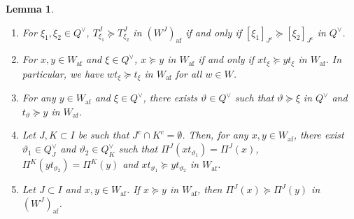 \documentclass[10pt]{amsart}
\newtheorem{lemm}[theo]{Lemma}
\theoremstyle{definition}\newtheorem{defi}[theo]{Definition}
\theoremstyle{remark}\newtheorem{rema}[theo]{Remark}
\DeclareMathOperator{\af}{af}
\begin{document}
\begin{lemm} \label{lem:easy}\ \\[-1.2em]
\begin{enumerate}[label=(\arabic*)]
\item\label{Lemm3.9_1}
For $\xi_1 , \xi_2 \in Q^{\vee}$, 
$T^J_{\xi_1} \succeq T^J_{\xi_2}$ 
in 
$(W^J)_{\af}$
if and only if 
$[\xi_1]_{J^c} \succeq [\xi_2]_{J^c}$ 
in 
$Q^{\vee}$.
\item\label{Lemm3.9_2}
For 
$x , y \in W_{\af}$
and 
$\xi \in Q^{\vee}$, 
$x \succeq y$ 
in 
$W_{\af}$
if and only if
$x t_{\xi} \succeq yt_{\xi}$
in 
$W_{\af}$. 
In particular, we have 
$wt_{\xi} \succeq t_{\xi}$ 
in 
$W_{\af}$ 
for all 
$w \in W$.
\item\label{Lemm3.9_3}
For any 
$y \in W_{\af}$
and 
$\xi \in Q^{\vee}$, 
there exists 
$\vartheta \in Q^{\vee}$
such that 
$\vartheta \succeq \xi$ 
in 
$Q^{\vee}$
and 
$t_{\vartheta} \succeq y$
in 
$W_{\af}$.
\item\label{Lemm3.9_4}
Let 
$J,K \subset I$ 
be such that 
$J^c \cap K^c = \emptyset$. 
Then, 
for any 
$x , y \in W_{\af}$, 
there exist
$\vartheta_1 \in Q_J^{\vee}$ 
and 
$\vartheta_2 \in Q_K^{\vee}$
such that 
$\Pi^J(x t_{\vartheta_1}) = \Pi^{J}(x)$, 
$\Pi^K(y t_{\vartheta_2}) = \Pi^K(y)$ and 
$x t_{\vartheta_1} \succeq y t_{\vartheta_2}$
in
$W_{\af}$.
\item\label{Lemm3.9_5}
Let $J \subset I$ and $x , y \in W_{\af}$. 
If 
$x \succeq y$ in $W_{\af}$, 
then 
$\Pi^J(x) \succeq \Pi^J(y)$ in $(W^J)_{\af}$.
\end{enumerate}
\end{lemm}
\end{document}
